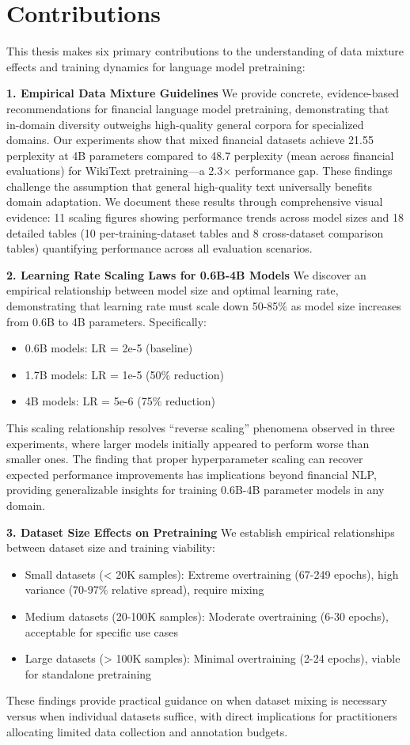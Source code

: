 \section{Contributions}

This thesis makes six primary contributions to the understanding of data mixture effects and training dynamics for language model pretraining:

\textbf{1. Empirical Data Mixture Guidelines}
We provide concrete, evidence-based recommendations for financial language model pretraining, demonstrating that in-domain diversity outweighs high-quality general corpora for specialized domains. Our experiments show that mixed financial datasets achieve 21.55 perplexity at 4B parameters compared to 48.7 perplexity (mean across financial evaluations) for WikiText pretraining—a 2.3$\times$ performance gap. These findings challenge the assumption that general high-quality text universally benefits domain adaptation. We document these results through comprehensive visual evidence: 11 scaling figures showing performance trends across model sizes and 18 detailed tables (10 per-training-dataset tables and 8 cross-dataset comparison tables) quantifying performance across all evaluation scenarios.

\textbf{2. Learning Rate Scaling Laws for 0.6B-4B Models}
We discover an empirical relationship between model size and optimal learning rate, demonstrating that learning rate must scale down 50-85\% as model size increases from 0.6B to 4B parameters. Specifically:
\begin{itemize}
    \item 0.6B models: LR = 2e-5 (baseline)
    \item 1.7B models: LR = 1e-5 (50\% reduction)
    \item 4B models: LR = 5e-6 (75\% reduction)
\end{itemize}
This scaling relationship resolves ``reverse scaling'' phenomena observed in three experiments, where larger models initially appeared to perform worse than smaller ones. The finding that proper hyperparameter scaling can recover expected performance improvements has implications beyond financial NLP, providing generalizable insights for training 0.6B-4B parameter models in any domain.

\textbf{3. Dataset Size Effects on Pretraining}
We establish empirical relationships between dataset size and training viability:
\begin{itemize}
    \item Small datasets (< 20K samples): Extreme overtraining (67-249 epochs), high variance (70-97\% relative spread), require mixing
    \item Medium datasets (20-100K samples): Moderate overtraining (6-30 epochs), acceptable for specific use cases
    \item Large datasets (> 100K samples): Minimal overtraining (2-24 epochs), viable for standalone pretraining
\end{itemize}
These findings provide practical guidance on when dataset mixing is necessary versus when individual datasets suffice, with direct implications for practitioners allocating limited data collection and annotation budgets.

